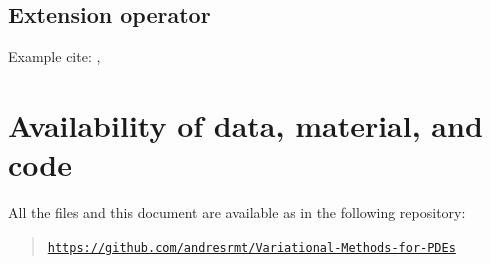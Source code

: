 \documentclass[a4paper,doc,11pt]{article}
\begin{document}
\subsection{Extension operator}



\vspace{2\baselineskip}

Example cite:
\citet{Brezis2010}, \citep{Brezis2010}







\section*{Availability of data, material, and code}
{

All the files and this document are available as in the following repository:
\begin{quote}
    \noindent \href{https://github.com/andresrmt/Variational-Methods-for-PDEs}{\texttt{https://github.com/andresrmt/Variational-Methods-for-PDEs}}
\end{quote}



}

\newpage



\end{document}
